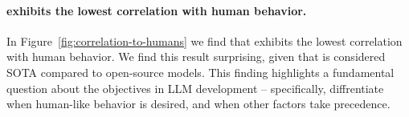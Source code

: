 \paragraph{\gpt{} exhibits the lowest correlation with human behavior.}
In Figure~\ref{fig:correlation-to-humans} we find that \gpt{} exhibits the lowest correlation with human behavior. We find this result surprising, given that \gpt{} is considered SOTA compared to open-source models. This finding highlights a fundamental question about the objectives in LLM development -- specifically, diffrentiate when human-like behavior is desired, and when other factors take precedence.





